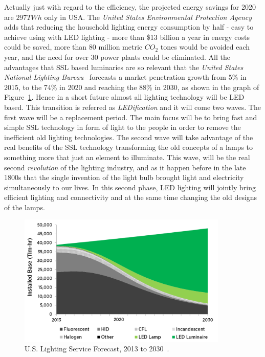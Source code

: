 Actually just with regard to the efficiency, the projected energy savings for 2020 are $297TWh$ only in USA. The \emph{United States Environmental Protection Agency}~\cite{14USDoE} adds that reducing the household lighting energy consumption by half - easy to achieve using with LED lighting -  more than \$13 billion a year in energy costs could be saved, more than 80 million metric $CO_2$ tones would be avoided each year, and the need for over 30 power plants could be eliminated. All the advantages that SSL based luminaries are so relevant that the \emph{United States National Lighting Bureau}~\cite{14USDoE} forecasts a market penetration growth from 5\% in 2015, to the 74\% in 2020 and reaching the 88\% in 2030, as shown in the graph of Figure~\ref{fig:lighting_forecast}. Hence in a short future almost all lighting technology will be LED based.
This transition is referred as \emph{LEDification} and it will come two waves. The first wave will be a replacement period. The main focus will be to bring fast and simple SSL technology in form of light to the people in order to remove the inefficient old lighting technologies. The second wave will take advantage of the real benefits of the SSL technology transforming the old concepts of a lamps to something more that just an element to illuminate. This wave, will be the real second \emph{revolution} of the lighting industry, and as it happen before in the late 1800s that the single invention of the light bulb brought light and electricity simultaneously to our lives. In this second phase, LED lighting will jointly bring efficient lighting and connectivity and at the same time changing the old designs of the lamps.

\begin{figure}[!h]
\centering
\includegraphics[width=10cm]{./0_intro/img/lighting_forecast.png}
\caption{U.S. Lighting Service Forecast, 2013 to 2030~\cite{14USDoE}.  }
\label{fig:lighting_forecast}
\end{figure}

